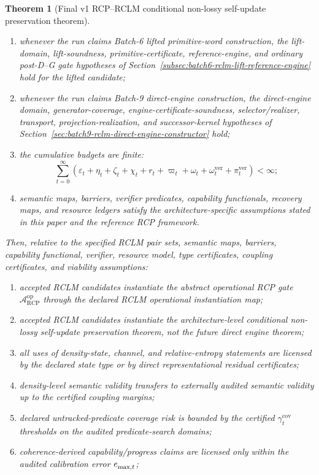 \documentclass[11pt,a4paper]{article}
\newtheorem{theorem}{Theorem}[section]
\newcommand{\Acal}{\mathcal A}
\newcommand{\eps}{\varepsilon}
\newcommand{\RCP}{\mathrm{RCP}}
\newcommand{\ver}{\mathrm{ver}}
\newcommand{\cov}{\mathrm{cov}}
\begin{document}
\begin{theorem}[Final v1 RCP--RCLM conditional non-lossy self-update preservation theorem]
\begin{enumerate}[label=(\alph*),leftmargin=1.5em]
    \item whenever the run claims Batch-6 lifted primitive-word construction, the lift-domain, lift-soundness, primitive-certificate, reference-engine, and ordinary post-D--G gate hypotheses of Section~\ref{subsec:batch6-rclm-lift-reference-engine} hold for the lifted candidate;
    \item whenever the run claims Batch-9 direct-engine construction, the direct-engine domain, generator-coverage, engine-certificate-soundness, selector/realizer, transport, projection-realization, and successor-kernel hypotheses of Section~\ref{sec:batch9-rclm-direct-engine-constructor} hold;
    \item the cumulative budgets are finite:
    \[
    \sum_{t=0}^{\infty}(\eps_t+\eta_t+\zeta_t+\chi_t+r_t+\varpi_t+\omega_t+\omega_t^{\ver}+\pi_t^{\ver})<\infty;
    \]
    \item semantic maps, barriers, verifier predicates, capability functionals, recovery maps, and resource ledgers satisfy the architecture-specific assumptions stated in this paper and the reference RCP framework.
\end{enumerate}
Then, relative to the specified RCLM pair sets, semantic maps, barriers, capability functional, verifier, resource model, type certificates, coupling certificates, and viability assumptions:
\begin{enumerate}[label=(\roman*),leftmargin=1.5em]
    \item accepted RCLM candidates instantiate the abstract operational RCP gate \(\Acal_{\RCP}^{\mathrm{op}}\) through the declared RCLM operational instantiation map;
    \item accepted RCLM candidates instantiate the architecture-level conditional non-lossy self-update preservation theorem, not the future direct engine theorem;
    \item all uses of density-state, channel, and relative-entropy statements are licensed by the declared state type or by direct representational residual certificates;
    \item density-level semantic validity transfers to externally audited semantic validity up to the certified coupling margins;
    \item declared untracked-predicate coverage risk is bounded by the certified \(\gamma_t^{\cov}\) thresholds on the audited predicate-search domains;
    \item coherence-derived capability/progress claims are licensed only within the audited calibration error \(e_{\max,t}^{\cal}\);

\end{enumerate}
\end{theorem}
\end{document}
